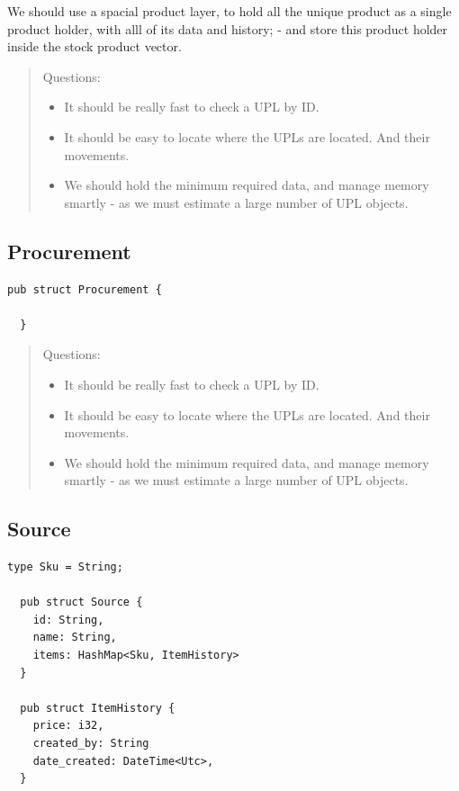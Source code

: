\documentclass{article}
\begin{document}
We should use a spacial product layer, to hold all the unique product
as a single product holder, with alll of its data and history; - and store
this product holder inside the stock product vector.

\begin{quote}
  Questions:
  \begin{itemize}
    \item It should be really fast to check a UPL by ID.
    \item It should be easy to locate where the UPLs are located.
          And their movements.
    \item We should hold the minimum required data,
          and manage memory smartly - as we must estimate a large number of
          UPL objects.
  \end{itemize}
\end{quote}

\subsection{Procurement}

\begin{lstlisting}[caption='Procurement Object']
  pub struct Procurement {
    
  }
\end{lstlisting}

\begin{quote}
  Questions:
  \begin{itemize}
    \item It should be really fast to check a UPL by ID.
    \item It should be easy to locate where the UPLs are located.
          And their movements.
    \item We should hold the minimum required data,
          and manage memory smartly - as we must estimate a large number of
          UPL objects.
  \end{itemize}
\end{quote}

\subsection{Source}

\begin{lstlisting}[caption='Source Object']
  type Sku = String;
  
  pub struct Source {
    id: String,
    name: String,
    items: HashMap<Sku, ItemHistory>
  }

  pub struct ItemHistory {
    price: i32,
    created_by: String
    date_created: DateTime<Utc>,
  }
\end{lstlisting}
\end{document}
